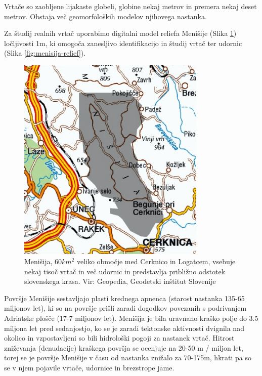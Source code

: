 \documentclass[a4paper, twoside, 12pt]{book}
\begin{document}
        Vrtače so zaobljene lijakaste globeli, globine nekaj metrov in premera nekaj deset metrov. Obstaja več geomorfoloških modelov njihovega nastanka.

        Za študij realnih vrtač uporabimo digitalni model reliefa Menišije (Slika \ref{fig:menisija-karta}) ločljivosti 1m, ki omogoča zanesljivo identifikacijo in študij vrtač ter udornic (Slika \ref{fig:menisija-relief}).

        \begin{figure}[h]
          \begin{center}
            \includegraphics[width=9cm]{slike/menisija-karta}
          \end{center}
          \caption{Menišija, $60 km^2$ veliko območje med Cerknico in Logatcem, vsebuje nekaj tisoč vrtač in več udornic in predstavlja približno odstotek slovenskega krasa. Vir: Geopedia, Geodetski inštitut Slovenije}
          \label{fig:menisija-karta}
        \end{figure}

        Površje Menišije sestavljajo plasti krednega apnenca (starost nastanka 135-65 miljonov let), ki so na površje prišli zaradi dogodkov povezanih s podrivanjem Adriatske plošče (17-7 miljonov let). Menišija je bila uravnano kraško polje do 3.5 miljona let pred sedanjostjo, ko se je zaradi tektonske aktivnosti dvignila nad okolico in vzpostavljeni so bili hidrološki pogoji za nastanek vrtač. Hitrost zniževanja (denudacije) kraškega površja se ocenjuje na 20-50 m / miljon let, torej se je površje Menišije v času od nastanka znižalo za 70-175m, hkrati pa so se v njem pojavile vrtače, udornice in brezstrope jame. \cite{Vrabec2006} \cite{Placer2010}
\end{document}
